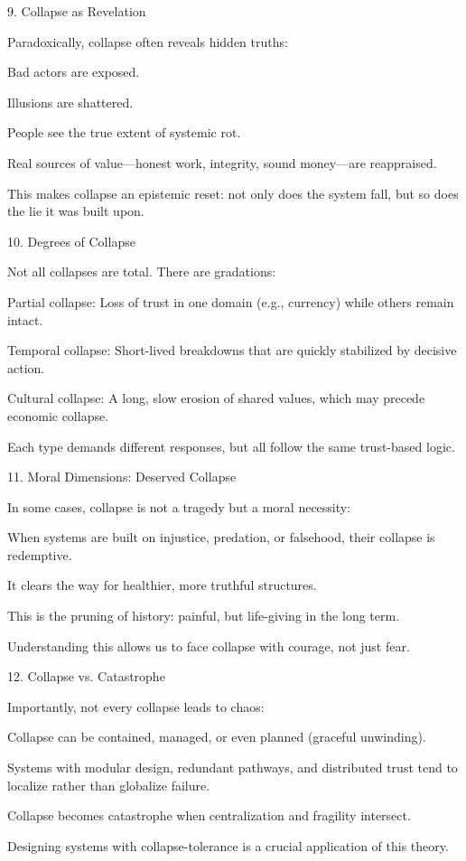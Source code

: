 \documentclass[11pt,oneside]{book}
\begin{document}
9. Collapse as Revelation


Paradoxically, collapse often reveals hidden truths:

    Bad actors are exposed.

    Illusions are shattered.

    People see the true extent of systemic rot.

    Real sources of value—honest work, integrity, sound money—are reappraised.

This makes collapse an epistemic reset: not only does the system fall, but so does the lie it was built upon.

10. Degrees of Collapse


Not all collapses are total. There are gradations:

    Partial collapse: Loss of trust in one domain (e.g., currency) while others remain intact.

    Temporal collapse: Short-lived breakdowns that are quickly stabilized by decisive action.

    Cultural collapse: A long, slow erosion of shared values, which may precede economic collapse.

Each type demands different responses, but all follow the same trust-based logic.

11. Moral Dimensions: Deserved Collapse


In some cases, collapse is not a tragedy but a moral necessity:

    When systems are built on injustice, predation, or falsehood, their collapse is redemptive.

    It clears the way for healthier, more truthful structures.

    This is the pruning of history: painful, but life-giving in the long term.

Understanding this allows us to face collapse with courage, not just fear.

12. Collapse vs. Catastrophe


Importantly, not every collapse leads to chaos:

    Collapse can be contained, managed, or even planned (graceful unwinding).

    Systems with modular design, redundant pathways, and distributed trust tend to localize rather than globalize failure.

    Collapse becomes catastrophe when centralization and fragility intersect.

Designing systems with collapse-tolerance is a crucial application of this theory.
\end{document}

